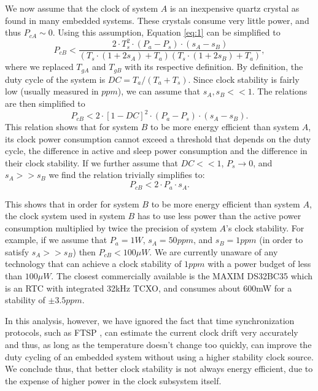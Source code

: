 We now assume that the clock of system $A$ is an inexpensive quartz crystal as
found in many embedded systems. These crystals consume very little power, and thus
$P_{cA} \sim 0$. Using this assumption, Equation \ref{eq:1} can be simplified to
\begin{equation}
P_{cB} < \frac{2\cdot T_s^2\cdot(P_a-P_s)\cdot(s_A-s_B)}{(T_s\cdot(1+2s_A)+T_a)(T_s\cdot(1+2s_B)+T_a)},
	\label{eq:2}
\end{equation}
where we replaced $T_{gA}$ and $T_{gB}$ with its respective definition. By definition, 
the duty cycle of the system is $DC=T_a/(T_a + T_s)$. Since clock stability is fairly low 
(usually measured in $ppm$), we can assume that $s_A, s_B << 1$. The relations are then 
simplified to
\begin{equation}
	P_{cB} < 2 \cdot [1-DC]^2\cdot (P_a-P_s) \cdot (s_A-s_B).
\end{equation}
This relation shows that for system $B$ to be more energy efficient than system $A$, 
its clock power consumption cannot exceed a threshold that depends on the duty cycle, 
the difference in active and sleep power consumption and the difference in their
clock stability. 
If we further assume that $DC << 1$, $P_s \rightarrow 0$, and $s_A >> s_B$ we find the 
relation trivially simplifies to:
\begin{equation}
	P_{cB} < 2 \cdot P_a \cdot s_A.
\end{equation}

This shows that in order for system $B$ to be more energy efficient than system
$A$, the clock system used in system $B$ has to use less power than the active
power consumption multiplied by twice the precision of system $A$'s clock
stability. For example, if we assume that $P_a=1W$, $s_A=50 ppm$, and $s_B=1
ppm$ (in order to satisfy $s_A >> s_B$) then $P_{cB} < 100 \mu W$. We
are currently unaware of any technology that can achieve a clock stability of
$1ppm$ with a power budget of less than $100 \mu W$. The closest commercially
available is the MAXIM DS32BC35 \cite{maxim2008ds32b35} which is
an RTC with integrated 32kHz TCXO, and consumes about 600mW for a stability of
$\pm 3.5ppm$. 

In this analysis, however, we have ignored the fact that time synchronization
protocols, such as FTSP \cite{maroti2004ftsp}, can estimate the current clock
drift very accurately and thus, as long as the temperature doesn't change too
quickly, can improve the duty cycling of an embedded system without using a
higher stability clock source. We conclude thus, that better clock stability 
is not always energy efficient, due to the expense of higher power in the clock
subsystem itself.  

